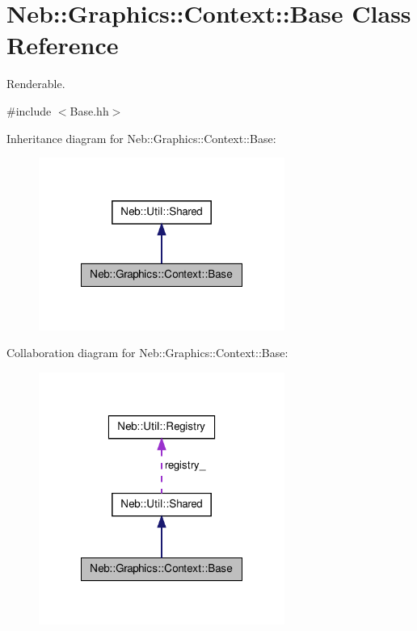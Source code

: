 \hypertarget{classNeb_1_1Graphics_1_1Context_1_1Base}{\section{\-Neb\-:\-:\-Graphics\-:\-:\-Context\-:\-:\-Base \-Class \-Reference}
\label{classNeb_1_1Graphics_1_1Context_1_1Base}
}


\-Renderable.  




{\ttfamily \#include $<$\-Base.\-hh$>$}



\-Inheritance diagram for \-Neb\-:\-:\-Graphics\-:\-:\-Context\-:\-:\-Base\-:\nopagebreak
\begin{figure}[H]
\begin{center}
\leavevmode
\includegraphics[width=228pt]{classNeb_1_1Graphics_1_1Context_1_1Base__inherit__graph}
\end{center}
\end{figure}


\-Collaboration diagram for \-Neb\-:\-:\-Graphics\-:\-:\-Context\-:\-:\-Base\-:\nopagebreak
\begin{figure}[H]
\begin{center}
\leavevmode
\includegraphics[width=228pt]{classNeb_1_1Graphics_1_1Context_1_1Base__coll__graph}
\end{center}
\end{figure}
